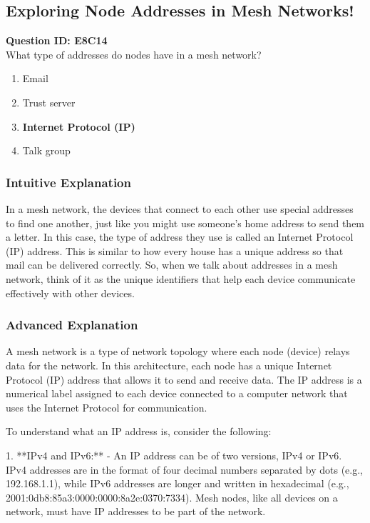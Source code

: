 \subsection{Exploring Node Addresses in Mesh Networks!}

\begin{tcolorbox}
\textbf{Question ID: E8C14} \\
What type of addresses do nodes have in a mesh network? 
\begin{enumerate}[label=\Alph*.]
    \item Email
    \item Trust server
    \item \textbf{Internet Protocol (IP)}
    \item Talk group
\end{enumerate}
\end{tcolorbox}

\subsubsection{Intuitive Explanation}
In a mesh network, the devices that connect to each other use special addresses to find one another, just like you might use someone's home address to send them a letter. In this case, the type of address they use is called an Internet Protocol (IP) address. This is similar to how every house has a unique address so that mail can be delivered correctly. So, when we talk about addresses in a mesh network, think of it as the unique identifiers that help each device communicate effectively with other devices.

\subsubsection{Advanced Explanation}
A mesh network is a type of network topology where each node (device) relays data for the network. In this architecture, each node has a unique Internet Protocol (IP) address that allows it to send and receive data. The IP address is a numerical label assigned to each device connected to a computer network that uses the Internet Protocol for communication.

To understand what an IP address is, consider the following:

1. **IPv4 and IPv6:** 
   - An IP address can be of two versions, IPv4 or IPv6. IPv4 addresses are in the format of four decimal numbers separated by dots (e.g., 192.168.1.1), while IPv6 addresses are longer and written in hexadecimal (e.g., 2001:0db8:85a3:0000:0000:8a2e:0370:7334). Mesh nodes, like all devices on a network, must have IP addresses to be part of the network.


